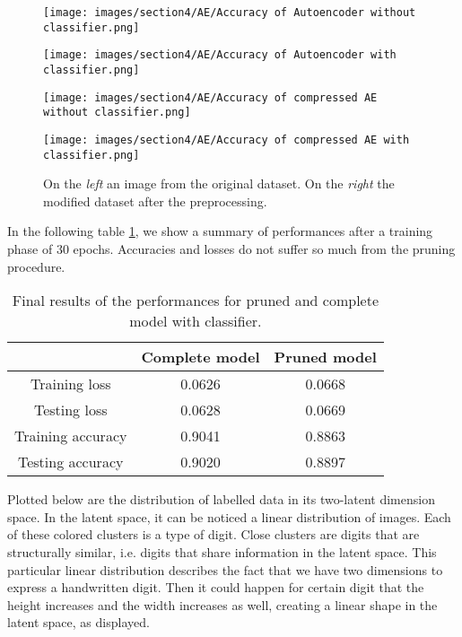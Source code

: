 \documentclass{article}
\begin{document}
\begin{figure}[H]
  \centering
  \begin{minipage}[c]{.4\textwidth}
   {\texttt{[image: images/section4/AE/Accuracy of Autoencoder without classifier.png]}}
    \end{minipage}
    \qquad \qquad
      \begin{minipage}[c]{0.4\textwidth}
  {\texttt{[image: images/section4/AE/Accuracy of Autoencoder with classifier.png]}}
     \end{minipage}
     \quad
  
     \begin{minipage}[c]{0.4\textwidth}
  {\texttt{[image: images/section4/AE/Accuracy of compressed AE without classifier.png]}}
  \end{minipage}
  \qquad \qquad
  \begin{minipage}[c]{0.4\textwidth}
    {\texttt{[image: images/section4/AE/Accuracy of compressed AE with classifier.png]}}
  \end{minipage}
  \quad
     
   \caption{On the \textit{left} an image from the original dataset.
   On the \textit{right} the modified dataset after the preprocessing.}
    \label{fig:accuracy}
\end{figure}

In the following table \ref{tab:results}, we show a summary of performances after a training phase of 30 epochs.
Accuracies and losses do not suffer so much from the pruning procedure.

\begin{table} [H]
  \centering
  \begin{tabular}{| c | c | c |}
  \hline
   & Complete model  &   Pruned model  \\
  \hline 
  \hline
  Training loss & 0.0626 & 0.0668 \\
  \hline
  Testing loss & 0.0628 & 0.0669 \\ 
  \hline
  Training accuracy & 0.9041 & 0.8863 \\ 
  \hline
  Testing accuracy & 0.9020 & 0.8897 \\
  \hline
  \end{tabular}
  \caption{Final results of the performances for pruned and complete model with classifier.}
  \label{tab:results}
\end{table}

Plotted below are the distribution of labelled data in its two-latent dimension space.
In the latent space, it can be noticed a linear distribution of images. 
Each of these colored clusters is a type of digit. 
Close clusters are digits that are structurally similar, i.e. digits that share information in the latent space. 
This particular linear distribution describes the fact that we have two dimensions to express a handwritten digit. 
Then it could happen for certain digit that the height increases and the width increases as well, creating a linear shape in the latent space, as displayed. 
\end{document}
